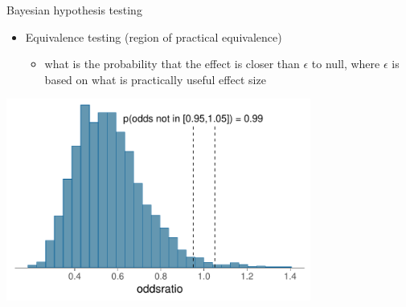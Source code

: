 \documentclass[english,t]{beamer}
\begin{document}
\begin{frame}{Bayesian hypothesis testing}

  \begin{itemize}
  \item Equivalence testing (region of practical equivalence)
    \begin{itemize}
    \item what is the probability that the effect is closer than
      $\epsilon$ to null, where $\epsilon$ is based on what is
      practically useful effect size
    \end{itemize}
  \end{itemize}

    {\includegraphics[width=10cm]{odds1_rope.pdf}}

\end{frame}
\end{document}
